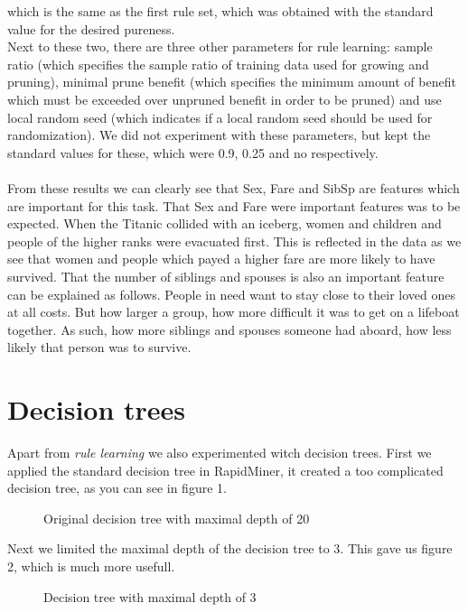 \documentclass[12pt,a4paper]{article}
\begin{document}
which is the same as the first rule set, which was obtained with the standard value for the desired pureness.\\
Next to these two, there are three other parameters for rule learning: sample ratio (which specifies the sample ratio of training data used for growing and pruning), minimal prune benefit (which specifies the minimum amount of benefit which must be exceeded over unpruned benefit in order to be pruned) and use local random seed (which indicates if a local random seed should be used for randomization). We did not experiment with these parameters, but kept the standard values for these, which were 0.9, 0.25 and no respectively.\\
\\
From these results we can clearly see that Sex, Fare and SibSp are features which are important for this task. That Sex and Fare were important features was to be expected. When the Titanic collided with an iceberg, women and children and people of the higher ranks were evacuated first. This is reflected in the data as we see that women and people which payed a higher fare are more likely to have survived. That the number of siblings and spouses is also an important feature can be explained as follows. People in need want to stay close to their loved ones at all costs. But how larger a group, how more difficult it was to get on a lifeboat together. As such, how more siblings and spouses someone had aboard, how less likely that person was to survive.

\section{Decision trees}

Apart from \emph{rule learning} we also experimented witch decision trees. First we applied the standard decision tree in RapidMiner, it created a too complicated decision tree, as you can see in figure 1.
\begin{figure}[H]
  \centering
  
  \caption{Original decision tree with maximal depth of 20}
\end{figure}
Next we limited the maximal depth of the decision tree to 3. This gave us figure 2, which is much more usefull.
\begin{figure}[H]
  \centering
  
  \caption{Decision tree with maximal depth of 3}
\end{figure}
\end{document}
